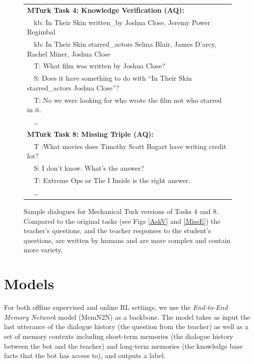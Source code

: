 \begin{figure}[!ht]
\centering
\footnotesize
\begin{tabular}{|l|}
\cline{1-1}
 {\bf MTurk Task 4:  Knowledge Verification (AQ): } \\
~~kb:  In Their Skin written\_by Joshua Close, Jeremy Power Regimbal      \\
~~kb:  In Their Skin starred\_actors Selma Blair, James D'arcy, Rachel Miner, Joshua Close \\
~~{\color{blue}T: What film was written by Joshua Close?}                                           \\
~~{\color{red}S: Does it have something to do with ``In Their Skin starred\_actors Joshua Close''?}  \\
~~{\color{blue}T: No we were looking for who wrote the film not who starred in it.}                \\
~~\dots\\
\cline{1-1}
\cline{1-1}
{\bf MTurk Task 8: Missing Triple (AQ):} \\
~~{\color{blue}T :What movies does Timothy Scott Bogart have writing credit for?}\\
~~{\color{red}S:  I don't know. What's the answer?} \\
~~{\color{blue}T: Extreme Ops or The I Inside is the right answer.} \\
~~\dots\\
\cline{1-1}
\end{tabular}
\caption[Sample dialogues for Mechanical Turk versions of Tasks 4 and 8]{Sample dialogues for Mechanical Turk versions of Tasks 4 and 8. Compared to the original
tasks (see Figs \ref{AskV} and \ref{MissE}) the teacher's questions, and the teacher
 responses to the student's questions,
 are written by humans and are more complex and contain more variety.
\label{example-MT-Tasks}
}
\end{figure}

\section{Models}
For both  offline supervised and online RL settings, we use the {\it End-to-End Memory Network}
model (MemN2N) \citep{sukhbaatar2015end} as a backbone. The
model takes as input the last utterance of the dialogue history (the question
from the teacher) as well as a set of memory contexts including
short-term memories (the dialogue history between the bot and the teacher) and
long-term memories (the knowledge base facts that the bot has access to),
and outputs a label.



